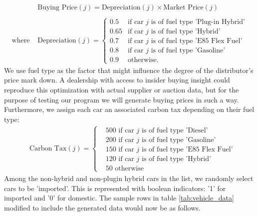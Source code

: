 \documentclass{article}
\begin{document}
\begin{align*}
 &\text{Buying Price}(j) = \text{Depreciation}(j) \times \text{Market Price}(j)\\\\
 \text{where } &\text{Depreciation}(j)=\begin{cases}
     0.5 & \text{if car } j \text{ is of fuel type 'Plug-in Hybrid'}\\
     0.65 & \text{if car } j \text{ is of fuel type 'Hybrid'}\\
     0.7 & \text{if car } j \text{ is of fuel type 'E85 Flex Fuel'}\\
     0.8 & \text{if car } j \text{ is of fuel type 'Gasoline'}\\
     0.9 & \text{otherwise.}
 \end{cases}
\end{align*}
We use fuel type as the factor that might influence the degree of the distributor's price mark down. A dealership with access to insider buying insight could reproduce this optimization with actual supplier or auction data, but for the purpose of testing our program we will generate buying prices in such a way. Furthermore, we assign each car an associated carbon tax depending on their fuel type:
\begin{align*}
    &\text{Carbon Tax}(j)=
    \begin{cases}
        & 500 \text { if car } j \text{ is of fuel type 'Diesel'}\\
        & 200 \text { if car } j \text{ is of fuel type 'Gasoline'}\\
        & 150 \text { if car } j \text{ is of fuel type 'E85 Flex Fuel'}\\
        & 120 \text { if car } j \text{ is of fuel type 'Hybrid'}\\
        & 50 \text { otherwise}
    \end{cases}
\end{align*}
Among the non-hybrid and non-plugin hybrid cars in the list, we randomly select cars to be 'imported'. This is represented with boolean indicators: '1' for imported and '0' for domestic. The sample rows in table \ref{tab:vehicle_data} modified to include the generated data would now be as follows.
\end{document}
